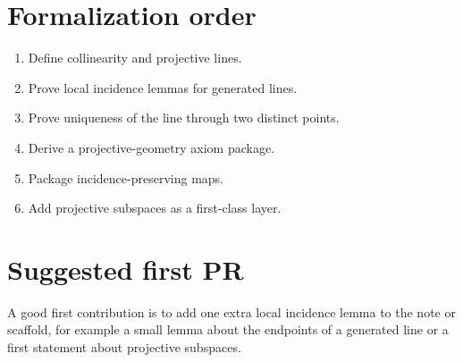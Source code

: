 \documentclass[11pt]{article}
\begin{document}
\section{Formalization order}

\begin{enumerate}
\item Define collinearity and projective lines.
\item Prove local incidence lemmas for generated lines.
\item Prove uniqueness of the line through two distinct points.
\item Derive a projective-geometry axiom package.
\item Package incidence-preserving maps.
\item Add projective subspaces as a first-class layer.
\end{enumerate}

\section{Suggested first PR}

A good first contribution is to add one extra local incidence lemma to the note
or scaffold, for example a small lemma about the endpoints of a generated line
or a first statement about projective subspaces.
\end{document}
